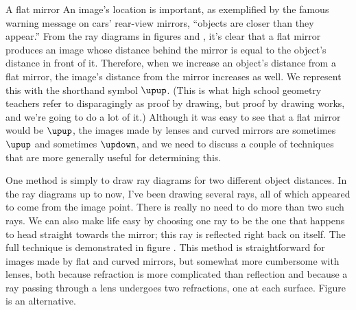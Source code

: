 \begin{envsubsection}{A flat mirror}
An image's location is important, as exemplified by the famous warning message
on cars' rear-view mirrors, ``objects are closer than they appear.'' From the
ray diagrams in figures  and , it's
clear that a flat mirror produces an image whose distance behind the mirror is
equal to the object's distance in front of it. Therefore, when we increase an
object's distance from a flat mirror, the image's distance from the mirror increases
as well. We represent this with the shorthand symbol $\upup$.
(This is what high school
geometry teachers refer to disparagingly as proof by drawing, but proof by drawing
works, and we're going to do a lot of it.) 
Although it was easy to see that a
flat mirror would be $\upup$, the images made by lenses and curved mirrors are
sometimes $\upup$ and sometimes $\updown$, and we need to discuss a couple
of techniques that are more generally useful for determining this.

%
One method is simply to draw ray diagrams for two different object distances.
In the ray diagrams up to now, I've been drawing several rays, all of which
appeared to come from the image point. There is really no need to do more than
two such rays. We can also make life easy by choosing one ray to be the one
that happens to head straight towards the mirror; this ray is reflected right
back on itself. The full technique is demonstrated in figure
. This method is straightforward for images made
by flat and curved mirrors, but somewhat more cumbersome with lenses, both because
refraction is more complicated than reflection and because a ray passing through a
lens undergoes two refractions, one at each surface. Figure 
is an alternative.
\end{envsubsection}
%
